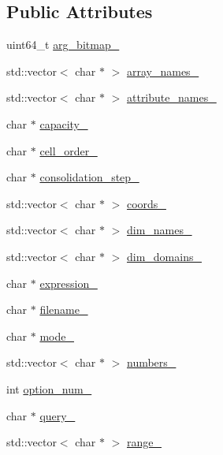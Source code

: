 \subsection*{Public Attributes}
\begin{DoxyCompactItemize}
\item 
uint64\+\_\+t \hyperlink{classCommandLine_ab9c3f466109c4f8c0e21003af135482a}{arg\+\_\+bitmap\+\_\+}
\item 
std\+::vector$<$ char $\ast$ $>$ \hyperlink{classCommandLine_ac33bfae7756e68fa2f7fc2538cf4a8ac}{array\+\_\+names\+\_\+}
\item 
std\+::vector$<$ char $\ast$ $>$ \hyperlink{classCommandLine_ad900ef70d91535497ecedc948254805a}{attribute\+\_\+names\+\_\+}
\item 
char $\ast$ \hyperlink{classCommandLine_a4b2c6066274035a5bea2adcbe71bcfa3}{capacity\+\_\+}
\item 
char $\ast$ \hyperlink{classCommandLine_a881b548c171d82e592d19b8f91b7c4fe}{cell\+\_\+order\+\_\+}
\item 
char $\ast$ \hyperlink{classCommandLine_abb7c1c0a9693309c885c69c7d8243215}{consolidation\+\_\+step\+\_\+}
\item 
std\+::vector$<$ char $\ast$ $>$ \hyperlink{classCommandLine_abe5adf7e0e46e33bbacab8def5146d54}{coords\+\_\+}
\item 
std\+::vector$<$ char $\ast$ $>$ \hyperlink{classCommandLine_a5d7aca6c2ef5530d8f53850b485d93d2}{dim\+\_\+names\+\_\+}
\item 
std\+::vector$<$ char $\ast$ $>$ \hyperlink{classCommandLine_ab75e4302c09ff1ca0cc099374e914b93}{dim\+\_\+domains\+\_\+}
\item 
char $\ast$ \hyperlink{classCommandLine_a4503d0d4214e51a6884629b29e771ed7}{expression\+\_\+}
\item 
char $\ast$ \hyperlink{classCommandLine_aa4e002e557fc4b4974daa827a3883930}{filename\+\_\+}
\item 
char $\ast$ \hyperlink{classCommandLine_a584f279447430b2da687a3d5687c4d7e}{mode\+\_\+}
\item 
std\+::vector$<$ char $\ast$ $>$ \hyperlink{classCommandLine_a75a014324b812198360edc99ad4e84b6}{numbers\+\_\+}
\item 
int \hyperlink{classCommandLine_a63edf2445a1152f2989ac28b1a64f475}{option\+\_\+num\+\_\+}
\item 
char $\ast$ \hyperlink{classCommandLine_ab3a511c590a3202c4629d7770eb08dee}{query\+\_\+}
\item 
std\+::vector$<$ char $\ast$ $>$ \hyperlink{classCommandLine_a2df474de00bbcd25dfacacf28494220f}{range\+\_\+}

\end{DoxyCompactItemize}
